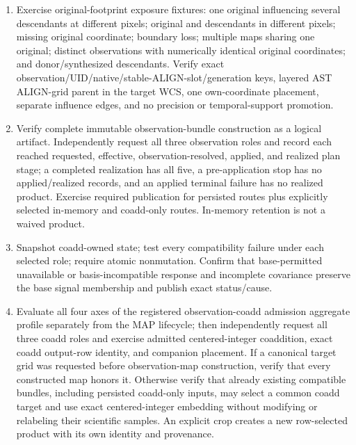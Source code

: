 \documentclass[10pt]{article}
\begin{document}
\begin{enumerate}
output-row identity and cardinality, plus
one-pixel, one-hot half-open-boundary, prohibited-fractional, covariance,
fixed-state response, full-procedure comparison-space typing, and distinct-fact
observation outputs, to independent expected values; retained storage rows do
not count as scientific output rows.
\item Exercise original-footprint exposure fixtures: one original influencing
several descendants at different pixels; original and descendants in
different pixels; missing original coordinate; boundary loss; multiple maps
sharing one original; distinct observations with numerically identical
original coordinates; and donor/synthesized descendants. Verify exact
observation/UID/native/stable-ALIGN-slot/generation keys, layered AST
ALIGN-grid parent in the target WCS, one own-coordinate placement, separate
influence edges, and no precision or temporal-support promotion.
\item Verify complete immutable observation-bundle construction as a logical
artifact. Independently request all three observation roles and record each
reached requested, effective, observation-resolved, applied, and realized plan
stage; a completed realization has all five, a pre-application stop has no
applied/realized records, and an applied terminal failure has no realized
product. Exercise
required publication for persisted routes plus explicitly selected in-memory
and coadd-only routes.  In-memory retention is not a waived product.
\item Snapshot coadd-owned state; test every compatibility failure under each
selected role; require atomic nonmutation. Confirm that base-permitted
unavailable or basis-incompatible response and incomplete covariance preserve
the base signal membership and publish exact status/cause.
\item Evaluate all four axes of the registered observation-coadd admission
aggregate profile separately from the MAP lifecycle; then independently
request all three coadd roles and exercise admitted
centered-integer coaddition, exact coadd output-row identity, and companion
placement.  If a canonical target grid was requested before observation-map
construction, verify that every constructed map honors it.  Otherwise verify
that already existing compatible bundles, including persisted coadd-only
inputs, may select a common coadd target and use exact centered-integer
embedding without modifying or relabeling their scientific samples.  An
explicit crop creates a new row-selected product with its own identity and
provenance.

\end{enumerate}
\end{document}
